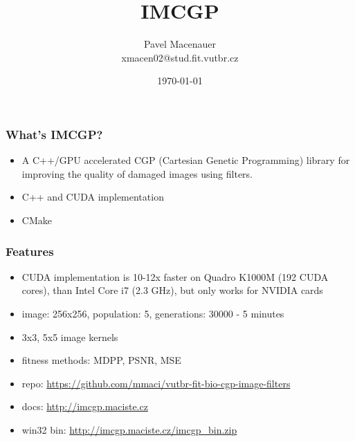 \documentclass{beamer}
\title{\textbf{IMCGP}}
\author{
	\large{Pavel Macenauer} \\ 
	\tiny{xmacen02@stud.fit.vutbr.cz}
}
\date{\tiny{\today}}
\institute[FIT VUTBR]
{
	\inst{}
	Faculty of Information Technology \\
	Brno University of Technology
}
\begin{document}
	\begin{frame}[t,plain]
	\titlepage
	\tableofcontents[currentsection]
	\vspace{-10mm}
	\end{frame}

	
	
	
	\begin{frame}[t,fragile]
		\frametitle{What's IMCGP?}
		
		\begin{itemize}
			\item A C++/GPU accelerated CGP (Cartesian Genetic Programming) library for improving the quality of damaged images using filters.		
			\item C++ and CUDA implementation
			\item CMake
		\end{itemize}		 
		
	\end{frame}


	\begin{frame}[t,fragile]
		\frametitle{Features}
		
		\begin{itemize}

			\item CUDA implementation is 10-12x faster on Quadro K1000M (192 CUDA cores), than Intel Core i7 (2.3 GHz), but only works for NVIDIA cards
			\item image: 256x256, population: 5, generations: 30000 - 5 minutes
			\item 3x3, 5x5 image kernels
			\item fitness methods: MDPP, PSNR, MSE
			\item repo: \url{https://github.com/mmaci/vutbr-fit-bio-cgp-image-filters}
			\item docs: \url{http://imcgp.maciste.cz}
			\item win32 bin: \url{http://imcgp.maciste.cz/imcgp_bin.zip}
		\end{itemize}							
			
	\end{frame}
	
\end{document}
